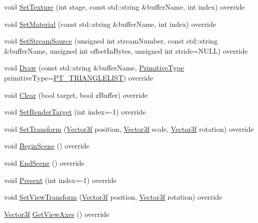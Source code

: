 \begin{DoxyCompactItemize}
\item 
void \mbox{\hyperlink{classse_1_1_direct3_d_a5e78e332321a2a66ba184b4441e3ec31}{Set\+Texture}} (int stage, const std\+::string \&buffer\+Name, int index) override
\item 
void \mbox{\hyperlink{classse_1_1_direct3_d_acfaad7a7cfbace7d34eb7dae9e9bf9d2}{Set\+Material}} (const std\+::string \&buffer\+Name, int index) override
\item 
void \mbox{\hyperlink{classse_1_1_direct3_d_a0be0c6f8f0c90478def2ade3459226ba}{Set\+Stream\+Source}} (unsigned int stream\+Number, const std\+::string \&buffer\+Name, unsigned int offset\+In\+Bytes, unsigned int stride=N\+U\+LL) override
\item 
void \mbox{\hyperlink{classse_1_1_direct3_d_ac6d9e0950a4b58d716aa08b52f79a9ab}{Draw}} (const std\+::string \&buffer\+Name, \mbox{\hyperlink{namespacese_a2b33c0ed67b2f6ac40fc08d56b5984f9}{Primitive\+Type}} primitive\+Type=\mbox{\hyperlink{namespacese_a2b33c0ed67b2f6ac40fc08d56b5984f9ae5169632705e9235a4423477202499c1}{P\+T\+\_\+\+T\+R\+I\+A\+N\+G\+L\+E\+L\+I\+ST}}) override
\item 
void \mbox{\hyperlink{classse_1_1_direct3_d_a932f57e7ffc1ae9b796599a36e861d02}{Clear}} (bool target, bool z\+Buffer) override
\item 
void \mbox{\hyperlink{classse_1_1_direct3_d_aa16f869f28af6e16c9ce11a2608ca845}{Set\+Render\+Target}} (int index=-\/1) override
\item 
void \mbox{\hyperlink{classse_1_1_direct3_d_a87c8a92e7b236a2f80f29008f22ccc8e}{Set\+Transform}} (\mbox{\hyperlink{namespacese_a12e07512d95e2fdebdaf74a5ea2cf5f6}{Vector3f}} position, \mbox{\hyperlink{namespacese_a12e07512d95e2fdebdaf74a5ea2cf5f6}{Vector3f}} scale, \mbox{\hyperlink{namespacese_a12e07512d95e2fdebdaf74a5ea2cf5f6}{Vector3f}} rotation) override
\item 
void \mbox{\hyperlink{classse_1_1_direct3_d_a0509351979bce1ab27d7cbd6cdc4b5de}{Begin\+Scene}} () override
\item 
void \mbox{\hyperlink{classse_1_1_direct3_d_acaa80262dcbd93b7aa03bd61e854b2a2}{End\+Scene}} () override
\item 
void \mbox{\hyperlink{classse_1_1_direct3_d_a8fcf9f471230162031c50080bf8e44b5}{Present}} (int index=-\/1) override
\item 
void \mbox{\hyperlink{classse_1_1_direct3_d_a0294b31c151540af98c78d1e33cb369a}{Set\+View\+Transform}} (\mbox{\hyperlink{namespacese_a12e07512d95e2fdebdaf74a5ea2cf5f6}{Vector3f}} position, \mbox{\hyperlink{namespacese_a12e07512d95e2fdebdaf74a5ea2cf5f6}{Vector3f}} rotation) override
\item 
\mbox{\hyperlink{namespacese_a12e07512d95e2fdebdaf74a5ea2cf5f6}{Vector3f}} \mbox{\hyperlink{classse_1_1_direct3_d_a74d6926ba18dac6ce23c7dea433de7bd}{Get\+View\+Axes}} () override
\end{DoxyCompactItemize}


